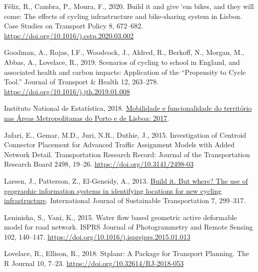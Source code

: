 \documentclass{isprs} %
\newlength{\cslhangindent}
\newlength{\cslentryspacingunit} %
\newenvironment{CSLReferences}[2] %
 {%
  \setlength{\parindent}{0pt}
  \ifodd #1
  \let\oldpar\par
  \def\par{\hangindent=\cslhangindent\oldpar}
  \fi
  \setlength{\parskip}{#2\cslentryspacingunit}
 }%
 {}
\begin{document}
\begin{CSLReferences}{0}{0}
\leavevmode{}%
Félix, R., Cambra, P., Moura, F., 2020. Build it and give `em bikes, and they will come: {The} effects of cycling infrastructure and bike-sharing system in {Lisbon}. Case Studies on Transport Policy 8, 672--682. \url{https://doi.org/10.1016/j.cstp.2020.03.002}

\leavevmode{}%
Goodman, A., Rojas, I.F., Woodcock, J., Aldred, R., Berkoff, N., Morgan, M., Abbas, A., Lovelace, R., 2019. Scenarios of cycling to school in {England}, and associated health and carbon impacts: {Application} of the {``{Propensity} to {Cycle Tool}.''} Journal of Transport \& Health 12, 263--278. \url{https://doi.org/10.1016/j.jth.2019.01.008}

\leavevmode{}%
Instituto National de Estatística, 2018. \href{https://www.ine.pt/xportal/xmain?xpid=INE\&xpgid=ine_publicacoes\&PUBLICACOESpub_boui=349495406\&PUBLICACOESmodo=2\&xlang=pt}{Mobilidade e funcionalidade do território nas {Áreas Metropolitanas} do {Porto} e de {Lisboa}: 2017}.

\leavevmode{}%
Jafari, E., Gemar, M.D., Juri, N.R., Duthie, J., 2015. Investigation of {Centroid Connector Placement} for {Advanced Traffic Assignment Models} with {Added Network Detail}. Transportation Research Record: Journal of the Transportation Research Board 2498, 19--26. \url{https://doi.org/10.3141/2498-03}

\leavevmode{}%
Larsen, J., Patterson, Z., El-Geneidy, A., 2013. \href{http://www.tandfonline.com/doi/abs/10.1080/15568318.2011.631098}{Build it. {But} where? {The} use of geographic information systems in identifying locations for new cycling infrastructure}. International Journal of Sustainable Transportation 7, 299--317.

\leavevmode{}%
Leninisha, S., Vani, K., 2015. Water flow based geometric active deformable model for road network. ISPRS Journal of Photogrammetry and Remote Sensing 102, 140--147. \url{https://doi.org/10.1016/j.isprsjprs.2015.01.013}

\leavevmode{}%
Lovelace, R., Ellison, R., 2018. Stplanr: {A Package} for {Transport Planning}. The R Journal 10, 7--23. \url{https://doi.org/10.32614/RJ-2018-053}


\end{CSLReferences}
\end{document}
